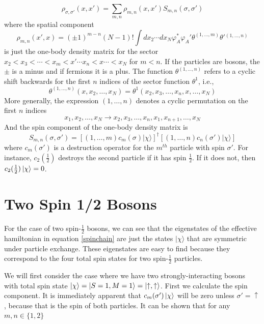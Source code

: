 \documentclass[onecolumn,english,aps,pra]{revtex4}
\begin{document}
\begin{equation}
\rho_{\sigma, \sigma'}(x, x') = \sum_{m, n} \rho_{m, n}(x, x') S_{m, n}(\sigma, \sigma')
\end{equation}
%
where the spatial component 
%
\begin{equation}
\rho_{m, n}(x', x) = (\pm 1)^{m-n} (N - 1)! \int dx_{2} \cdots dx_{N} \varphi_{A}^{*} \varphi_{A}' \theta^{(1,\ldots,m)} \theta'{}^{(1,\ldots, n)}
\end{equation}
%
is just the one-body density matrix for the sector $x_2 < x_3 < \cdots < x_m < x' \cdots x_n < x \cdots < x_N$ for $m < n$. If the particles are bosons, the $\pm$ is a minus and if fermions it is a plus. The function $\theta^{(1,\ldots, n)}$ refers to a cyclic shift backwards for the first $n$ indices of the sector function $\theta^1$, i.e., 
%
\[ \theta^{(1,\ldots, n)}(x, x_2, \ldots, x_N) = \theta^1(x_2, x_3, \ldots, x_n, x, \ldots, x_N) \]
%
More generally, the expression $(1,\ldots, n)$ denotes a cyclic permutation on the first $n$ indices
\[ x_1, x_2, \ldots, x_N \longrightarrow x_2, x_3, \ldots, x_n, x_1, x_{n+1}, \ldots, x_N \]
%
And the spin component of the one-body density matrix is
%
\begin{equation}
S_{m, n}(\sigma, \sigma') = [(1, \ldots, m) c_m(\sigma)|\chi \rangle ]^\dagger [(1, \ldots, n) c_n(\sigma')|\chi \rangle ]
\end{equation}
%
where $c_m(\sigma')$ is a destruction operator for the $m^{th}$ particle with spin $\sigma'$. For instance, $c_2(\frac{1}{2})$ destroys the second particle if it has spin $\frac{1}{2}$. If it does not, then $c_2(\frac{1}{2}) \ket{\chi} = 0$.

\section{Two Spin 1/2 Bosons}

For the case of two spin-$\frac{1}{2}$ bosons, we can see that the eigenstates of the effective hamiltonian in equation \eqref{spinchain} are just the states $| \chi \rangle$ that are symmetric under particle exchange. These eigenstates are easy to find because they correspond to the four total spin states for two spin-$\frac{1}{2}$ particles. 

We will first consider the case where we have two strongly-interacting bosons with total spin state $\ket{\chi} = \ket{ S= 1,M= 1 } = \ket{\uparrow, \uparrow}$. First we calculate the spin component. It is immediately apparent that $ c_m(\sigma') \ket{\chi}$ will be zero unless $\sigma' = \uparrow$, because that is the spin of both particles. It can be shown that for any $m, n \in \{ 1, 2 \}$
\end{document}
